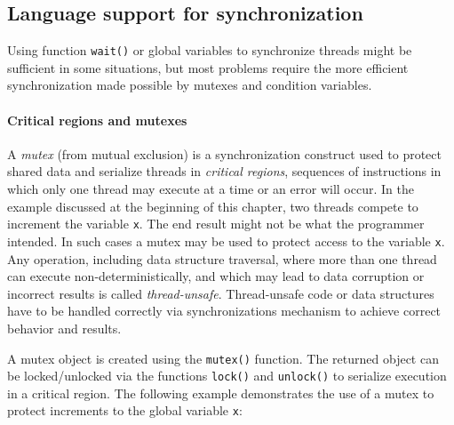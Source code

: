 \subsection*{Language support for synchronization}

Using function \texttt{wait()} or global variables to synchronize threads might
be sufficient in some situations, but most problems require the more efficient
synchronization made possible by mutexes and condition variables.

\paragraph{Critical regions and mutexes}

A \emph{mutex} (from mutual exclusion) is a synchronization construct
used to protect shared data and serialize threads in \emph{critical
regions}, sequences of instructions in which only one thread may
execute at a time or an error will occur. In the example discussed at
the beginning of this chapter, two threads compete to increment the
variable \texttt{x}. The end result might not be what the programmer
intended. In such cases a mutex may be used to protect access to the
variable \texttt{x}. Any operation, including data structure
traversal, where more than one thread can execute
non-deterministically, and which may lead to data corruption or
incorrect results is called \emph{thread-unsafe}. Thread-unsafe code
or data structures have to be handled correctly via synchronizations
mechanism to achieve correct behavior and results.

A mutex object is created using the \texttt{mutex()} function. The returned
object can be locked/unlocked via the functions \texttt{lock()} and
\texttt{unlock()} to serialize execution in a critical region. The following
example demonstrates the use of a mutex to protect increments to the global
variable \texttt{x}:


